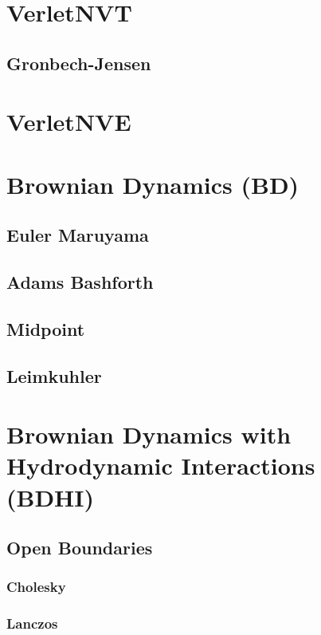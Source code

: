
\chapter{VerletNVT}
\section{Gronbech-Jensen}
\chapter{VerletNVE}

\chapter{Brownian Dynamics (BD)}

\section{Euler Maruyama}

\section{Adams Bashforth}

\section{Midpoint}

\section{Leimkuhler}

\chapter{Brownian Dynamics with Hydrodynamic Interactions (BDHI)}

\section{Open Boundaries}

\subsection{Cholesky}

\subsection{Lanczos}

